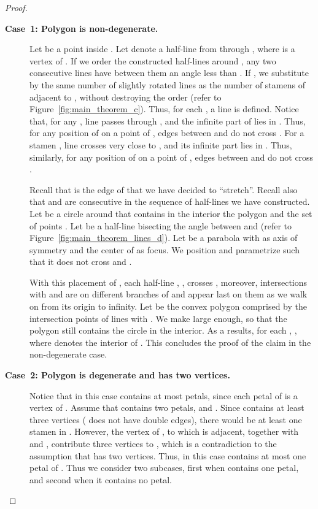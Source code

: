 \documentclass{llncs}
\begin{document}
\begin{proof}
\begin{description}
\item[\bf Case~1: Polygon  is non-degenerate.] 
Let  be a point inside . Let  denote a half-line from  through , where  is a vertex of . If we order the constructed half-lines around , any two consecutive lines have between them an angle less than . If , we substitute  by the same number of slightly rotated lines as the number of stamens of  adjacent to , without destroying the order (refer to Figure~\ref{fig:main_theorem_c}). Thus, for each , a line  is defined. Notice that, for any , line  passes through , and the infinite part of  lies in . Thus, for any position of  on a point of , edges between  and  do not cross . For a stamen , line  crosses  very close to , and its infinite part lies in . Thus, similarly, for any position of  on a point of , edges between  and  do not cross .
 
Recall that  is the edge of  that we have decided to ``stretch''. Recall also that  and  are consecutive in  the sequence of half-lines 
we have constructed. Let  be a circle around  that contains in the interior the polygon  and the set of points . Let  be a half-line bisecting the angle between  and  (refer to Figure~\ref{fig:main_theorem_lines_d}). Let  be a parabola with  as axis of symmetry and the center of  as focus. We position and parametrize  such that it does not cross  and . 

With this placement of , each half-line , , crosses , moreover, intersections with  and  are on different branches of  and appear last on them as we walk on  from its 
origin to infinity. Let  be the convex polygon comprised by the intersection points of lines  
with . We make  large enough, so that the polygon  still contains the circle  in the interior. As a results, for each , , where  denotes the interior of .   
This concludes the proof of the claim in the non-degenerate case.

\item[\bf Case~2: Polygon  is degenerate and has two vertices.] Notice that in this case  contains at most  petals, since each petal of  is a vertex of . Assume that  contains two petals,  and . Since  contains at least three vertices ( does not have double edges), there would be at least one stamen  in . However, the vertex of , to which  is adjacent, together with  and , contribute three vertices to , which is a contradiction to the assumption that  has two vertices. Thus, in this case  contains at most one petal of .  Thus we consider two subcases, first when   contains one petal, and second when it contains no petal.


\end{description}
\end{proof}
\end{document}
